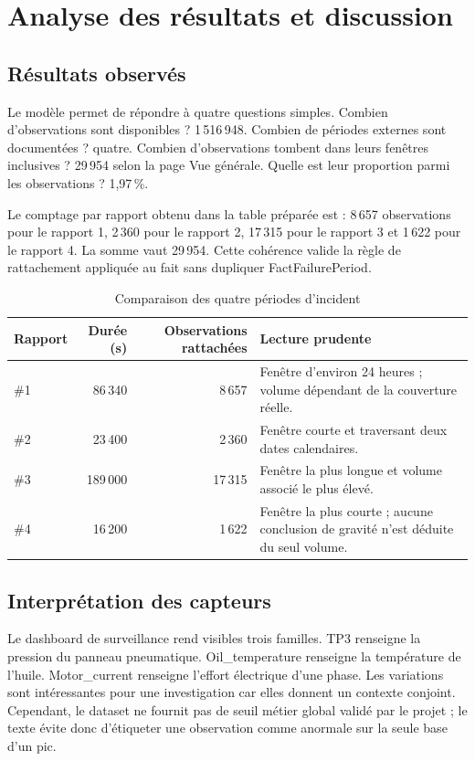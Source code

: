 \chapter{Analyse des résultats et discussion}

\section{Résultats observés}
Le modèle permet de répondre à quatre questions simples. Combien d'observations sont disponibles ? 1\,516\,948. Combien de périodes externes sont documentées ? quatre. Combien d'observations tombent dans leurs fenêtres inclusives ? 29\,954 selon la page Vue générale. Quelle est leur proportion parmi les observations ? 1,97\,\%.

Le comptage par rapport obtenu dans la table préparée est : 8\,657 observations pour le rapport 1, 2\,360 pour le rapport 2, 17\,315 pour le rapport 3 et 1\,622 pour le rapport 4. La somme vaut 29\,954. Cette cohérence valide la règle de rattachement appliquée au fait sans dupliquer FactFailurePeriod.

\begin{table}[H]
\centering
\caption{Comparaison des quatre périodes d'incident}
\label{tab:incident-comparison}
\begin{tabularx}{\textwidth}{l r r X}
\toprule
Rapport & Durée (s) & Observations rattachées & Lecture prudente\\
\midrule
\#1 & 86\,340 & 8\,657 & Fenêtre d'environ 24 heures ; volume dépendant de la couverture réelle.\\
\#2 & 23\,400 & 2\,360 & Fenêtre courte et traversant deux dates calendaires.\\
\#3 & 189\,000 & 17\,315 & Fenêtre la plus longue et volume associé le plus élevé.\\
\#4 & 16\,200 & 1\,622 & Fenêtre la plus courte ; aucune conclusion de gravité n'est déduite du seul volume.\\
\bottomrule
\end{tabularx}
\end{table}

\section{Interprétation des capteurs}
Le dashboard de surveillance rend visibles trois familles. TP3 renseigne la pression du panneau pneumatique. Oil\_temperature renseigne la température de l'huile. Motor\_current renseigne l'effort électrique d'une phase. Les variations sont intéressantes pour une investigation car elles donnent un contexte conjoint. Cependant, le dataset ne fournit pas de seuil métier global validé par le projet ; le texte évite donc d'étiqueter une observation comme anormale sur la seule base d'un pic.


